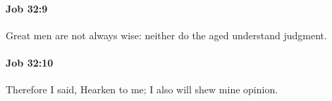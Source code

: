 		\paragraph{Job 32:9} %
			\label{JOB-32-9}

			Great men are not always wise: neither do the aged understand judgment.


		\paragraph{Job 32:10} %
			\label{JOB-32-10}

			Therefore I said, Hearken to me; I also will shew mine opinion.


